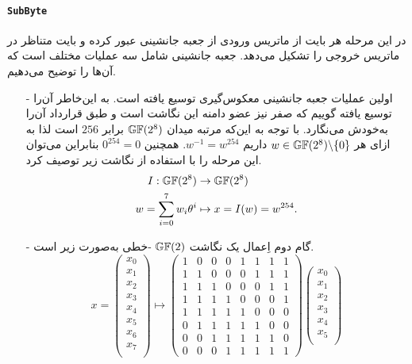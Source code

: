 \paragraph*{\texttt{SubByte}}
در این مرحله  هر بایت از ماتریس ورودی از جعبه جانشینی 
عبور کرده و بایت متناظر در ماتریس خروجی را تشکیل می‌دهد. جعبه جانشینی شامل سه عملیات مختلف است که آن‌ها را توضیح می‌دهیم. 
\begin{itemize}
\item[-]
اولین عملیات جعبه جانشینی معکوس‌گیری توسیع یافته است. به این‌خاطر آن‌را توسیع یافته گوییم که صفر نیز عضو دامنه این نگاشت است و طبق قرارداد آن‌را به‌خودش می‌نگارد. با توجه به این‌که مرتبه میدان 
$\gf(2^{8})$
برابر 
$256$
است لذا به ازای هر 
$w\in\gf(2^{8})\backslash \{0\}$
داریم 
$w^{-1} = w^{254}$. 
همچنین 
$0^{254}  = 0$
بنابراین می‌توان این مرحله را با استفاده از نگاشت زیر توصیف کرد. 
\begin{align*}
I:\mathbb{GF}(2^{8})&\rightarrow \mathbb{GF}(2^{8})\\
w = \sum_{i = 0}^{7} w_{i}\theta^{i}&\mapsto x = I(w) = w^{254}.
\end{align*}
\item[-]
گام دوم اِعمال یک نگاشت 
$\gf(2)$
-خطی به‌صورت زیر است. 
$$
x = \begin{pmatrix}
x_{0}\\
x_{1}\\
x_{2}\\
x_{3}\\
x_{4}\\
x_{5}\\
x_{6}\\
x_{7}\\
\end{pmatrix} \mapsto
\begin{pmatrix}
1&0&0&0&1&1&1&1\\
1&1&0&0&0&1&1&1\\
1&1&1&0&0&0&1&1\\
1&1&1&1&0&0&0&1\\
1&1&1&1&1&0&0&0\\
0&1&1&1&1&1&0&0\\
0&0&1&1&1&1&1&0\\
0&0&0&1&1&1&1&1
\end{pmatrix}
\begin{pmatrix}
x_{0}\\
x_{1}\\
x_{2}\\
x_{3}\\
x_{4}\\
x_{5}\\

\end{pmatrix}$$
\end{itemize}
